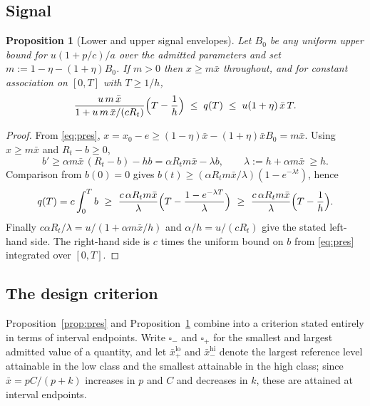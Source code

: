 \documentclass[11pt]{article}
\newtheorem{proposition}[theorem]{Proposition}
\theoremstyle{definition}
\theoremstyle{remark}
\newcommand{\xb}{\bar{x}}
\begin{document}
\subsection{Signal}

\begin{proposition}[Lower and upper signal envelopes]\label{prop:signal}
Let $B_0$ be any uniform upper bound for $u(1+p/c)/a$ over the admitted
parameters and set $m:=1-\eta-(1+\eta)B_0$. If $m>0$ then $x\ge m\xb$
throughout, and for constant association on $[0,T]$ with $T\ge1/h$,
\begin{equation}
\frac{u\,m\,\xb}{1+u\,m\,\xb/(cR_t)}\Bigl(T-\frac1h\Bigr)
\;\le\; q(T)\;\le\; u(1+\eta)\,\xb\,T .
\label{eq:signal}
\end{equation}
\end{proposition}

\begin{proof}
From \eqref{eq:pres}, $x=x_0-e\ge(1-\eta)\xb-(1+\eta)\xb B_0=m\xb$. Using
$x\ge m\xb$ and $R_t-b\ge0$,
\[
b'\ge\alpha m\xb\,(R_t-b)-hb=\alpha R_t m\xb-\lambda b,
\qquad \lambda:=h+\alpha m\xb\ \ge h .
\]
Comparison from $b(0)=0$ gives $b(t)\ge(\alpha R_tm\xb/\lambda)(1-e^{-\lambda t})$,
hence
\[
q(T)=c\int_0^Tb
\ \ge\ \frac{c\,\alpha R_t m\xb}{\lambda}\Bigl(T-\frac{1-e^{-\lambda T}}{\lambda}\Bigr)
\ \ge\ \frac{c\,\alpha R_t m\xb}{\lambda}\Bigl(T-\frac1h\Bigr).
\]
Finally $c\alpha R_t/\lambda=u/(1+\alpha m\xb/h)$ and $\alpha/h=u/(cR_t)$ give
the stated left-hand side. The right-hand side is $c$ times the uniform bound on
$b$ from \eqref{eq:pres} integrated over $[0,T]$.
\end{proof}

\subsection{The design criterion}

Proposition~\ref{prop:pres} and Proposition~\ref{prop:signal} combine into a
criterion stated entirely in terms of interval endpoints. Write $\square_-$ and
$\square_+$ for the smallest and largest admitted value of a quantity, and let
$\xb^{\mathrm{lo}}_+$ and $\xb^{\mathrm{hi}}_-$ denote the largest reference
level attainable in the low class and the smallest attainable in the high class;
since $\xb=pC/(p+k)$ increases in $p$ and $C$ and decreases in $k$, these are
attained at interval endpoints.
\end{document}
